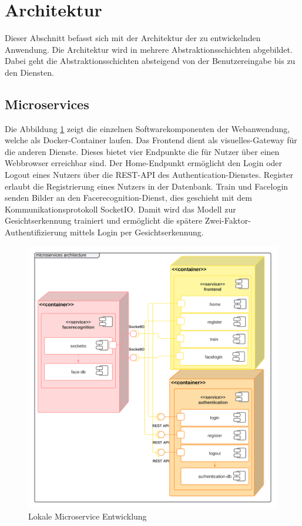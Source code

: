 \section{Architektur}
Dieser Abschnitt befasst sich mit der Architektur der zu entwickelnden Anwendung.
Die Architektur wird in mehrere Abstraktionsschichten abgebildet.
Dabei geht die Abstraktionsschichten absteigend von der Benutzereingabe bis zu den Diensten.


\subsection{Microservices}

Die Abbildung \ref{fig:UML-Microservices} zeigt die einzelnen Softwarekomponenten der Webanwendung, welche als Docker-Container laufen.
Das Frontend dient als visuelles-Gateway für die anderen Dienste.
Dieses bietet vier Endpunkte die für Nutzer über einen Webbrowser erreichbar sind.
Der Home-Endpunkt ermöglicht den Login oder Logout eines Nutzers über die REST-API des Authentication-Dienstes.
Register erlaubt die Registrierung eines Nutzers in der Datenbank.
Train und Facelogin senden Bilder an den Facerecognition-Dienst, dies geschieht mit dem Kommunikationsprotokoll SocketIO.
Damit wird das Modell zur Gesichtserkennung trainiert und ermöglicht die spätere Zwei-Faktor-Authentifizierung mittels Login per Gesichtserkennung.


\begin{figure}[!htb]
    \centering
    \includegraphics[width=1.0\columnwidth]{images/UML-Microservices-Diagramm.png}
    \caption{Lokale Microservice Entwicklung}
    \label{fig:UML-Microservices}
\end{figure}




